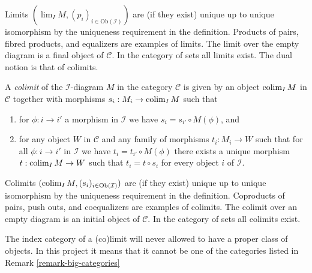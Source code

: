 \noindent
Limits $(\lim_I M, (p_i)_{i\in \text{Ob}(\mathcal{I})})$ are
(if they exist)
unique up to unique isomorphism by the uniqueness requirement
in the definition. Products of pairs, fibred products, and equalizers are
examples of limits. The limit over the empty diagram is a final object
of $\mathcal{C}$.
In the category of sets all limits exist.
The dual notion is that of colimits.

\begin{definition}
\label{definition-colimit}
A {\it colimit} of the $\mathcal{I}$-diagram $M$ in the category
$\mathcal{C}$ is given by an object $\mathop{\rm colim}\nolimits_I M$ in $\mathcal{C}$
together with morphisms $s_i : M_i \to \mathop{\rm colim}\nolimits_I M$ such that
\begin{enumerate}
\item for $\phi : i \to i'$ a morphism
in $\mathcal{I}$ we have $s_{i} = s_{i'} \circ M(\phi)$, and
\item for any object $W$ in $\mathcal{C}$ and any family of
morphisms $t_i : M_i \to W$ such that for all $\phi : i \to i'$
in $\mathcal{I}$ we have $t_{i} = t_{i'} \circ M(\phi)$ there
exists a unique morphism $t : \mathop{\rm colim}\nolimits_I M \to W$ such that
$t_i = t \circ s_i$ for every object $i$ of $\mathcal{I}$.
\end{enumerate}
\end{definition}

\noindent
Colimits $(\mathop{\rm colim}\nolimits_I M, (s_i)_{i\in \text{Ob}(\mathcal{I})})$ are
(if they exist) unique up to unique isomorphism by the uniqueness requirement
in the definition. Coproducts of pairs, push outs, and coequalizers are
examples of colimits. The colimit over an empty diagram is an initial object
of $\mathcal{C}$. In the category of sets all colimits exist.

\begin{remark}
\label{remark-diagram-small}
The index category of a (co)limit will never allowed to have
a proper class of objects. In this project it means that
it cannot be one of the categories listed in
Remark \ref{remark-big-categories}
\end{remark}

